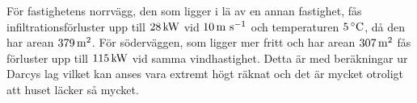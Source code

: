 För fastighetens norrvägg, den som ligger i lä av en annan fastighet, fås infiltrationsförluster upp till $\unit[28]{kW}$ vid $\unit[10]{m~s^{-1}}$ och temperaturen $\unit[5]{^\circ C}$, då den har arean $\unit[379]{m^2}$. För söderväggen, som ligger mer fritt och har arean $\unit[307]{m^2}$ fås förluster upp till $\unit[115]{kW}$ vid samma vindhastighet. Detta är med beräkningar ur Darcys lag vilket kan anses vara extremt högt räknat och det är mycket otroligt att huset läcker så mycket.

